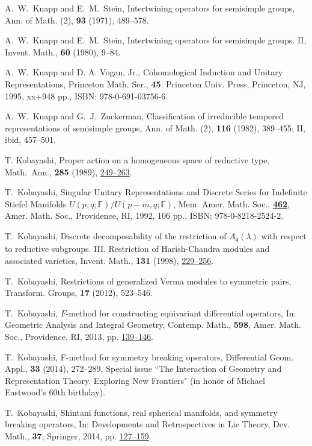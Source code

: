 \begin{thebibliography}{M}
A.~W.~Knapp and E.~M.~Stein,
Intertwining operators for semisimple groups,
Ann. of Math. (2), {\bf{93}} (1971), 489--578.

A.~W.~Knapp and E.~M.~Stein,
Intertwining operators for semisimple groups. II,
Invent. Math., {\bf{60}} (1980), 9--84.

A.~W.~Knapp and D. A. Vogan, Jr.,
Cohomological Induction and Unitary Representations,
Princeton Math. Ser., {\textbf{45}}. Princeton Univ. Press,
Princeton, NJ, 1995, xx+948 pp., ISBN: 978-0-691-03756-6.

A.~W.~Knapp and G.~J.~Zuckerman,
Classification of irreducible tempered representations of semisimple groups,
Ann. of Math. (2), {\bf{116}} (1982), 389--455;
II, ibid, 457--501.

T. Kobayashi, 
Proper action on a homogeneous space of reductive type,
Math.~Ann., {\bf{285}} (1989), 
\href{https://doi.org/10.1007/BF01443517}
{249--263}.  

T.~Kobayashi,
Singular Unitary Representations and Discrete Series for Indefinite Stiefel
Manifolds $U(p,q;{\mathbb{F}})/U(p-m,q;{\mathbb{F}})$,
Mem. Amer. Math. Soc.,
\href{http://www.ams.org/books/memo/0462/}{{\bf{462}}},
Amer. Math. Soc., Providence, RI,
1992, 106 pp., ISBN: 978-0-8218-2524-2.

T.~Kobayashi,
Discrete decomposability of the restriction of $A_{\mathfrak{q}}(\lambda)$
with respect to reductive subgroups. III.
Restriction of Harish-Chandra modules and associated varieties,
Invent. Math., {\bf{131}} (1998),
\href{http://dx.doi.org/10.1007/s002220050203}
{229--256}.

T.~Kobayashi,
Restrictions of generalized Verma modules to symmetric pairs,
Transform. Groups, {\bf{17}} (2012), 523--546.

T.~Kobayashi,
$F$-method for constructing equivariant differential operators,
In: Geometric Analysis and Integral Geometry,
Contemp. Math., {\bf{598}}, Amer. Math. Soc., Providence, RI,
2013, pp.
\href{http://dx.doi.org/10.1090/conm/598/11998}
{139--146}.

T.~Kobayashi,
F-method for symmetry breaking operators,
Differential Geom. Appl., {\bf{33}} (2014),
272--289, 
Special issue
``The Interaction of Geometry and Representation Theory.
Exploring New Frontiers"
(in honor of Michael Eastwood's 60th birthday).

T.~Kobayashi,
Shintani functions, real spherical manifolds, and symmetry breaking operators,
In: Developments and Retrospectives in Lie Theory,
Dev. Math., {\bf{37}}, Springer, 2014, pp.
\href{http://dx.doi.org/10.1007/978-3-319-09934-7_5}
{127--159}.


\end{thebibliography}
